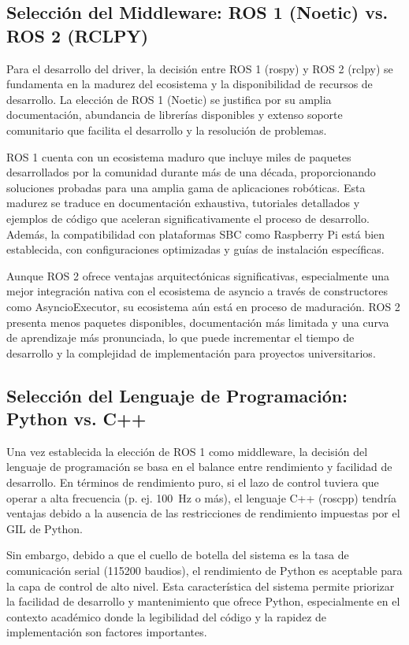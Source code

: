 \documentclass[11pt]{article}
\numberwithin{figure}{section}
\numberwithin{table}{section}
\begin{document}
\subsection{Selección del Middleware: ROS 1 (Noetic) vs. ROS 2 (RCLPY)}

Para el desarrollo del driver, la decisión entre ROS 1 (rospy) \cite{ROSWebsite} y ROS 2 (rclpy) \cite{Macenski2022ROS2} se fundamenta en la madurez del ecosistema y la disponibilidad de recursos de desarrollo. La elección de ROS 1 (Noetic) se justifica por su amplia documentación, abundancia de librerías disponibles y extenso soporte comunitario que facilita el desarrollo y la resolución de problemas.

ROS 1 cuenta con un ecosistema maduro que incluye miles de paquetes desarrollados por la comunidad durante más de una década, proporcionando soluciones probadas para una amplia gama de aplicaciones robóticas. Esta madurez se traduce en documentación exhaustiva, tutoriales detallados y ejemplos de código que aceleran significativamente el proceso de desarrollo. Además, la compatibilidad con plataformas SBC como Raspberry Pi está bien establecida, con configuraciones optimizadas y guías de instalación específicas.

Aunque ROS 2 ofrece ventajas arquitectónicas significativas, especialmente una mejor integración nativa con el ecosistema de asyncio a través de constructores como AsyncioExecutor, su ecosistema aún está en proceso de maduración. ROS 2 presenta menos paquetes disponibles, documentación más limitada y una curva de aprendizaje más pronunciada, lo que puede incrementar el tiempo de desarrollo y la complejidad de implementación para proyectos universitarios.


\subsection{Selección del Lenguaje de Programación: Python vs. C++}

Una vez establecida la elección de ROS 1 como middleware, la decisión del lenguaje de programación se basa en el balance entre rendimiento y facilidad de desarrollo. En términos de rendimiento puro, si el lazo de control tuviera que operar a alta frecuencia (p. ej. 100~Hz o más), el lenguaje C++ (roscpp) \cite{roscpp_ROSWiki} tendría ventajas debido a la ausencia de las restricciones de rendimiento impuestas por el GIL de Python.

Sin embargo, debido a que el cuello de botella del sistema es la tasa de comunicación serial (115200 baudios), el rendimiento de Python es aceptable para la capa de control de alto nivel. Esta característica del sistema permite priorizar la facilidad de desarrollo y mantenimiento que ofrece Python, especialmente en el contexto académico donde la legibilidad del código y la rapidez de implementación son factores importantes.
\end{document}
